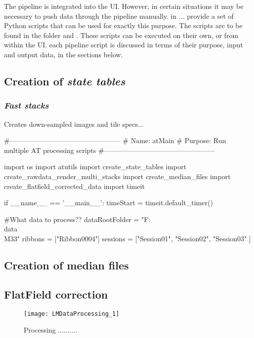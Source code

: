 The pipeline is integrated into the \ate UI. However, in certain situations it may be necessary to push data through the pipeline manually. \ate in ... provide a set of Python scripts that can be used for exactly this purpose. The scripts are to be found in the folder  and . These scripts can be executed on their own, or from within the UI. 
each pipeline script is discussed in terms of their purpose, input and output data, in the sections below.

\subsection{Creation of \emph{state tables}}
\subsubsection{\emph{Fast stacks}}
Creates down-sampled images and tile specs...

\singlespacing
\begin{python}    
#------------------------------------------------
# Name:        atMain
# Purpose:     Run multiple AT processing scripts
#------------------------------------------------

import os
import atutils
import create_state_tables
import create_rawdata_render_multi_stacks
import create_median_files
import create_flatfield_corrected_data
import timeit

if __name__ == '__main__':
    timeStart = timeit.default_timer()

    #What data to process??
    dataRootFolder = "F:\\data\\M33"
    ribbons = ["Ribbon0004"]
    sessions = ["Session01",
                "Session02",
                "Session03"
                ]

\end{python}

\doublespacing

\subsection{Creation of median files}
\subsection{FlatField correction}

\clearpage

\begin{figure}[h]
\centering\texttt{[image: LMDataProcessing\_1]}

\caption{Processing ..........}
\end{figure}

